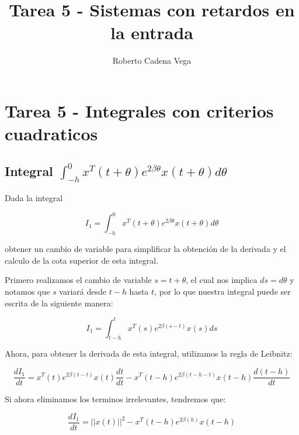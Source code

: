 

\author{Roberto Cadena Vega}
\title{Tarea 5 - Sistemas con retardos en la entrada}


    \maketitle

    \section*{Tarea 5 - Integrales con criterios cuadraticos}

        \subsection*{Integral $\int_{-h}^0 x^T(t + \theta) e^{2 \beta \theta} x(t + \theta) d \theta$}

            Dada la integral

            \begin{equation}
                I_1 = \int_{-h}^0 x^T(t + \theta) e^{2 \beta \theta} x(t + \theta) d \theta
            \end{equation}

            obtener un cambio de variable para simplificar la obtención de la derivada y el calculo de la cota superior de esta integral.

            Primero realizamos el cambio de variable $s = t + \theta$, el cual nos implica  $ds = d \theta$ y notamos que $s$ variará desde $t - h$ hasta $t$, por lo que nuestra integral puede ser escrita de la siguiente manera:

            \begin{equation*}
                I_1 = \int_{t - h}^t x^T(s) e^{2 \beta (s - t)} x(s) ds
            \end{equation*}

            Ahora, para obtener la derivada de esta integral, utilizamos la regla de Leibnitz:

            \begin{equation*}
                \frac{d I_1}{dt} = x^T(t) e^{2 \beta (t - t)} x(t) \frac{dt}{dt} - x^T(t - h) e^{2 \beta (t - h - t)} x(t - h) \frac{d(t - h)}{dt}
            \end{equation*}

            Si ahora eliminamos los terminos irrelevantes, tendremos que:

            \begin{equation*}
                \frac{d I_1}{dt} = || x(t) ||^2 - x^T(t - h) e^{2 \beta (h)} x(t - h)
            \end{equation*}

